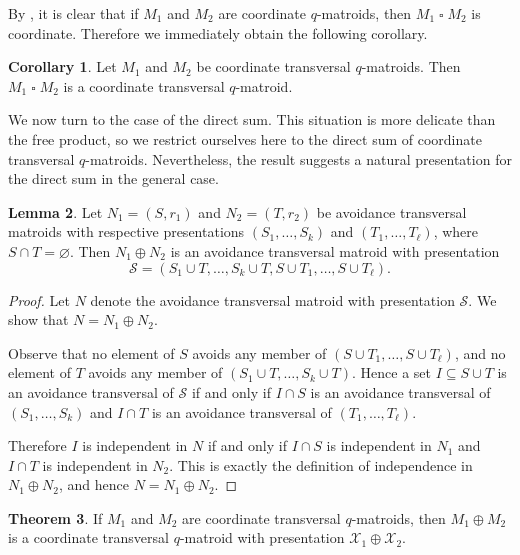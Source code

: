 \documentclass{article}
\theoremstyle{definition}
\newtheorem{theorem}{Theorem}[section]
\newtheorem{corollary}[theorem]{{{Corollary}}}
\newtheorem{lemma}[theorem]{{{Lemma}}}
\newcommand{\sq}{\mathbin{\square}}
\begin{document}
By \cite[Theorem 30]{AlfaranoByrneFulcher2025}, it is clear that if $M_1$ and $M_2$ are coordinate $q$-matroids, then $M_1\sq M_2$ is coordinate. Therefore we immediately obtain the following corollary.

\begin{corollary}\label{cor:free_prod}
    Let $M_1$ and $M_2$ be coordinate transversal $q$-matroids. Then $M_1\sq M_2$ is a coordinate transversal $q$-matroid.
\end{corollary}

We now turn to the case of the direct sum. This situation is more delicate than the free product, so we restrict ourselves here to the direct sum of coordinate transversal $q$-matroids. Nevertheless, the result suggests a natural presentation for the direct sum in the general case.

\begin{lemma}\label{lem:direct_sum_matroids}
Let $N_1=(S,r_1)$ and $N_2=(T,r_2)$ be avoidance transversal matroids with respective presentations $(S_1,\dots,S_k)$ and $(T_1,\dots,T_\ell)$, where $S\cap T=\varnothing$. Then $N_1\oplus N_2$ is an avoidance transversal matroid with presentation
\[
\mathcal{S}=(S_1\cup T,\dots,S_k\cup T,S\cup T_1,\dots,S\cup T_\ell).
\]
\end{lemma}

\begin{proof}
Let $N$ denote the avoidance transversal matroid with presentation $\mathcal{S}$. We show that $N=N_1\oplus N_2$.

Observe that no element of $S$ avoids any member of $(S\cup T_1,\dots,S\cup T_\ell)$, and no element of $T$ avoids any member of $(S_1\cup T,\dots,S_k\cup T)$. Hence a set $I\subseteq S\cup T$ is an avoidance transversal of $\mathcal{S}$ if and only if $I\cap S$ is an avoidance transversal of $(S_1,\dots,S_k)$ and $I\cap T$ is an avoidance transversal of $(T_1,\dots,T_\ell)$.

Therefore $I$ is independent in $N$ if and only if $I\cap S$ is independent in $N_1$ and $I\cap T$ is independent in $N_2$. This is exactly the definition of independence in $N_1\oplus N_2$, and hence $N=N_1\oplus N_2$.
\end{proof}

\begin{theorem}\label{thm:coord_q-mat_direct_sum}
If $M_1$ and $M_2$ are coordinate transversal $q$-matroids, then $M_1\oplus M_2$ is a coordinate transversal $q$-matroid with presentation $\mathcal{X}_1\oplus\mathcal{X}_2$.
\end{theorem}
\end{document}
